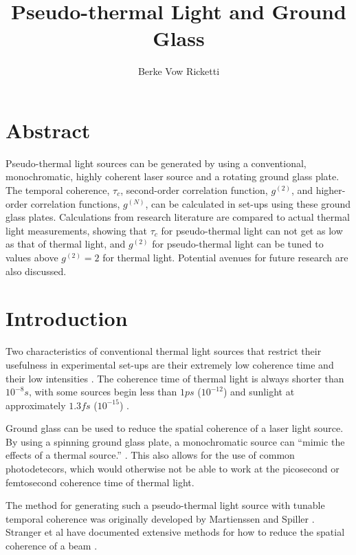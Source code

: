 \documentclass{article}
\title{Pseudo-thermal Light and Ground Glass}
\author{Berke Vow Ricketti}
\begin{document}
\maketitle{}





\section{Abstract}

Pseudo-thermal light sources can be generated by using a conventional, monochromatic, highly coherent laser source and a rotating ground glass plate. The temporal coherence, $\tau_{c}$, second-order correlation function, $g^{(2)}$, and higher-order correlation functions, $g^{(N)}$, can be calculated in set-ups using these ground glass plates. Calculations from research literature are compared to actual thermal light measurements, showing that $\tau_{c}$ for pseudo-thermal light can not get as low as that of thermal light, and $g^{(2)}$ for pseudo-thermal light can be tuned to values above $g^{(2)} = 2$ for thermal light. Potential avenues for future research are also discussed.

\section{Introduction}

Two characteristics of conventional thermal light sources that restrict their
usefulness in experimental set-ups are their extremely low coherence time and
their low intensities \cite{Spiller2014}. The coherence time of thermal light is
always shorter than $10^{-8}s$, with some sources begin less than $1 ps$ ($10^{-12}$)
and sunlight at approximately $1.3fs$ ($10^{-15}$) \cite{Spiller2014,Deutsch}.

Ground glass can be used to reduce the spatial coherence of a laser light source. By using a spinning ground glass plate, a monochromatic source can ``mimic the effects of a thermal source.'' \cite{Grider1996}. This also allows for the use of common photodetecors, which would otherwise not be able to work at the picosecond or femtosecond coherence time of thermal light.

The method for generating such a pseudo-thermal light source with tunable
temporal coherence was originally developed by Martienssen and Spiller \cite{Spiller2014}. Stranger et al have documented extensive methods for how to reduce the spatial coherence of a beam \cite{Ndersson2017}.
\end{document}
